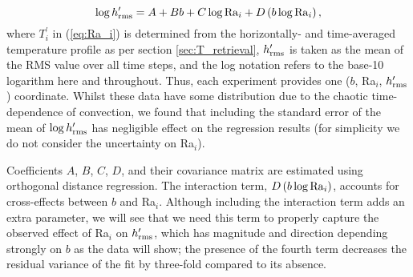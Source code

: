 \documentclass[trackchanges]{aastex63}
\newcommand{\todo}[1]{\textit{\textcolor{violet}{{#1}}}}
\newcommand{\jr}[1]{\textit{\textcolor{blue}{{#1}}}}
\begin{document}
\begin{equation} \label{eq:h_Ra_scaling}
\log h_{\rm rms}^\prime = A  + B b + C\log{\rm Ra}_i + D \left(b  \log{\rm Ra}_i\right),
\end{equation}
where $T_i^\prime$ in (\ref{eq:Ra_i}) is determined from the horizontally- and time-averaged temperature profile as per section \ref{sec:T_retrieval}, $h_{\rm rms}^\prime$ is taken as the mean of the RMS value over all time steps, and the log notation refers to the base-10 logarithm here and throughout. Thus, each experiment provides one ($b$, Ra$_i$, $h_{\rm rms}^\prime$) coordinate. Whilst these data have some distribution due to the chaotic time-dependence of convection, we found that including the standard error of the mean of $\log h_{\rm rms}^\prime$ has negligible effect on the regression results (for simplicity we do not consider the uncertainty on Ra$_i$). 

Coefficients $A$, $B$, $C$, $D$, and their covariance matrix are estimated using orthogonal distance regression. The interaction term, $D \left(b  \log{\rm Ra}_i\right)$, accounts for cross-effects between $b$ and Ra$_i$. Although including the interaction term adds an extra parameter, we will see that we need this term to properly capture the observed effect of Ra$_i$ on $h_{\rm rms}^\prime$, which has magnitude and direction depending strongly on $b$ as the data will show; the presence of the fourth term decreases the residual variance of the fit by three-fold compared to its absence. 





\end{document}
